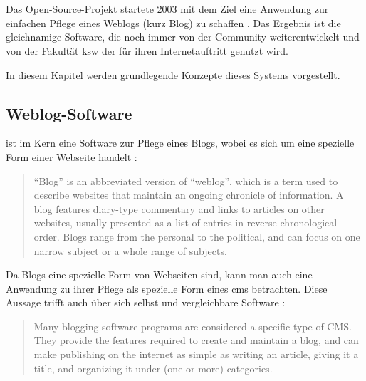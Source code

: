 \section{\wordpress}
    \label{section:WordPress}
    Das Open-Source-Projekt {\wordpress} startete 2003
    mit dem Ziel eine Anwendung zur einfachen Pflege eines Weblogs
    (kurz Blog) zu schaffen \cite{wordpress:About}.
    Das Ergebnis ist die gleichnamige Software,
    die noch immer von der Community weiterentwickelt
    und von der Fakultät \gls{ksw} der {\fernUni} für ihren
    Internetauftritt genutzt wird.

    In diesem Kapitel werden grundlegende Konzepte dieses Systems vorgestellt.

    \subsection{Weblog-Software}
        \label{section:weblogSoftware}
        {\wordpress} ist im Kern eine Software zur Pflege eines Blogs,
        wobei es sich um eine spezielle Form einer Webseite handelt
        \cite{wordpress:Blogging}:

        \begin{quote}
            "`Blog"' is an abbreviated version of "`weblog"',
            which is a term used to describe websites that maintain
            an ongoing chronicle of information.
            A blog features diary-type commentary and links to articles
            on other websites, usually presented as a list of entries in
            reverse chronological order.
            Blogs range from the personal to the political,
            and can focus on one narrow subject or a whole range of subjects.
        \end{quote}

        Da Blogs eine spezielle Form von Webseiten sind,
        kann man auch eine Anwendung zu ihrer Pflege als
        spezielle Form eines \gls{cms} betrachten.
        Diese Aussage trifft {\wordpress} auch über sich selbst
        und vergleichbare Software \cite{wordpress:Blogging}:

        \begin{quote}
            Many blogging software programs are considered a specific type of CMS.
            They provide the features required to create and maintain a blog,
            and can make publishing on the internet as simple as writing an article,
            giving it a title, and organizing it under (one or more) categories.
        \end{quote}

